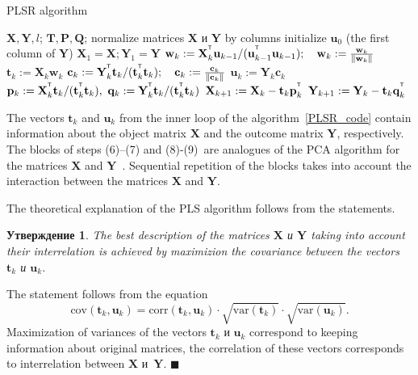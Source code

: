 \documentclass[12pt,twoside]{article}
\newtheorem{statement}{Утверждение}
\newcommand{\bw}{\mathbf{w}}
\newcommand{\bY}{\mathbf{Y}}
\newcommand{\bX}{\mathbf{X}}
\newcommand{\bu}{\mathbf{u}}
\newcommand{\bt}{\mathbf{t}}
\newcommand{\bp}{\mathbf{p}}
\newcommand{\bq}{\mathbf{q}}
\newcommand{\bc}{\mathbf{c}}
\newcommand{\bP}{\mathbf{P}}
\newcommand{\bT}{\mathbf{T}}
\newcommand{\bQ}{\mathbf{Q}}
\newcommand{\T}{^{\text{\tiny\sffamily\upshape\mdseries T}}}
\begin{document}
\begin{algorithm}[h]
\caption{PLSR algorithm}
\label{PLSR_code}
\begin{algorithmic}[1]
	\REQUIRE $\bX, \bY, l$;
	\ENSURE $\bT, \bP, \bQ$;
	\STATE normalize matrices $\bX$ и $\bY$ by columns
	\STATE initialize $\bu_0$ (the first column of $\bY$)
	\STATE $\bX_1 = \bX; \bY_1 = \bY$
	\REPEAT
	\vspace{0.1cm}
	\STATE $\bw_k := \bX_k^{\T} \bu_{k-1} / (\bu_{k-1}^{\T} \bu_{k-1}); \quad \bw_k: = \frac{\bw_k}{\| \bw_k \|}$
	\vspace{0.1cm}
	\STATE $\bt_k := \bX_k \bw_k$
	\vspace{0.1cm}
	\STATE $\bc_k := \bY_k^{\T} \bt_k / (\bt_k^{\T} \bt_k); \quad \bc_k: = \frac{\bc_k}{\| \bc_k \|}$
	\vspace{0.1cm}
	\STATE $\bu_k := \bY_k \bc_k$
	\UNTIL{$\bt_k$ stabilizes}
	\vspace{0.1cm}
	\STATE $\bp_k:= \bX_k^{\T}\bt_k/(\bt_k^{\T}\bt_k),\ 
	\bq_k := \bY_k^{\T}\bt_k/(\bt_k^{\T}\bt_k)$
	\vspace{0.2cm}
	\STATE $\bX_{k+1} :=  \bX_k - \bt_k \bp_k^{\T}$
	\vspace{0.2cm}
	\STATE $\bY_{k + 1} :=  \bY_k - \bt_k \bq_k^{\T}$ 
	\ENDFOR
\end{algorithmic}
\end{algorithm}

The vectors $\bt_k$ and $\bu_k$ from the inner loop of the algorithm~\ref{PLSR_code} contain information about the object matrix $\bX$ and the outcome matrix $\bY$, respectively. 
The blocks of steps (6)--(7) and (8)-(9)~are analogues of the PCA algorithm for the matrices $\bX$ and $\bY$~\cite{geladi1986partial}. 
Sequential repetition of the blocks takes into account the interaction between the matrices $\bX$ and $\bY$.

The theoretical explanation of the PLS algorithm follows from the statements.
\begin{statement}
The best description of the matrices $\bX$ и $\bY$ taking into account their interrelation is achieved by maximizion the covariance between the vectors $\bt_k$ и $\bu_k$.
\end{statement}
The statement follows from the equation
\[
\text{cov} (\bt_k, \bu_k) = \text{corr} (\bt_k, \bu_k) \cdot \sqrt{\text{var}(\bt_k)} \cdot \sqrt{\text{var}(\bu_k)}.
\]
Maximization of variances of the vectors $\bt_k$ и $\bu_k$ correspond to keeping information about original matrices, the correlation of these vectors corresponds to interrelation between $\bX$ и~$\bY$. $\blacksquare$
\end{document}

